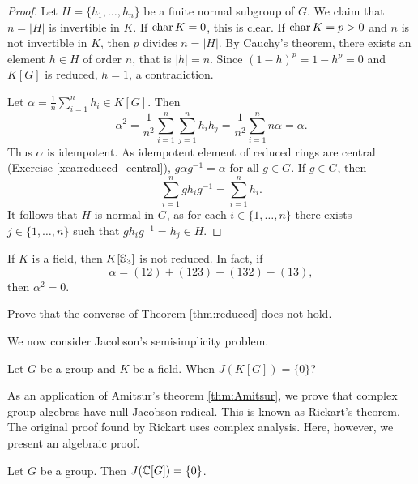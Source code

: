 \begin{proof}
    Let $H=\{h_1,\dots,h_n\}$ be a finite normal subgroup of $G$. 
    We claim that $n=|H|$ is invertible in $K$. If $\operatorname{char} K=0$, this 
    is clear. If $\operatorname{char} K=p>0$ and $n$ is not invertible in $K$, 
    then $p$ divides $n=|H|$. By Cauchy's theorem, 
    there exists an element $h\in H$ of order $n$, that is 
    $|h|=n$. Since $(1-h)^p=1-h^p=0$ and $K[G]$ is reduced,
    $h=1$, a contradiction. 
    
    Let $\alpha=\frac{1}{n}\sum_{i=1}^nh_i\in K[G]$. Then
    \[
    \alpha^2=\frac{1}{n^2}\sum_{i=1}^n\sum_{j=1}^nh_ih_j
    =\frac{1}{n^2}\sum_{i=1}^nn\alpha=\alpha.
    \]
    Thus $\alpha$ is idempotent. As idempotent 
    element of reduced rings are central (Exercise \ref{xca:reduced_central}), 
    $g\alpha g^{-1}=\alpha$ for all $g\in G$. If $g\in G$, 
    then 
    \[
    \sum_{i=1}^n gh_ig^{-1}=\sum_{i=1}^n h_i.
    \]
    It follows that $H$ is normal in $G$, 
    as for each $i\in\{1,\dots,n\}$ 
    there exists $j\in\{1,\dots,n\}$ such that 
    $gh_ig^{-1}=h_j\in H$. 
\end{proof}

\begin{example}
    If $K$ is a field, then $K[\mathbb{S}_3]$ is not reduced. 
    In fact, 
    if 
    \[
    \alpha=(12)+(123)-(132)-(13),
    \]
    then 
    $\alpha^2=0$. 
\end{example}

\begin{exercise}
    Prove that the converse of Theorem \ref{thm:reduced} 
    does not hold. 
\end{exercise}


We now consider Jacobson's semisimplicity problem. 

\begin{openproblem}
\label{Jacobson's semisimplicity problem}
Let $G$ be a group and $K$ be a field. When $J(K[G])=\{0\}$?
\end{openproblem}

As an application of Amitsur's theorem \ref{thm:Amitsur}, 
we prove that 
complex group algebras have null Jacobson radical.
This is known as 
Rickart's theorem. The original proof found by Rickart 
uses complex analysis. Here, however, 
we present an algebraic proof. 

\begin{theorem}[Rickart]
\label{thm:Rickart}
    Let $G$ be a group. Then $J(\mathbb{C}[G])=\{0\}$.
\end{theorem}

